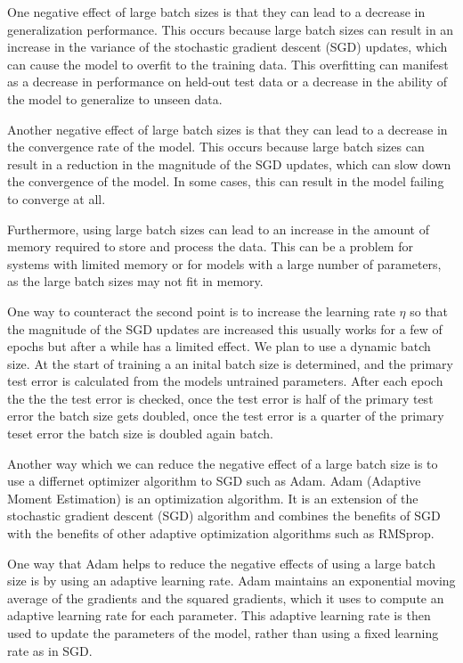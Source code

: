 \documentclass[11pt]{article}
\begin{document}
One negative effect of large batch sizes is that they can lead to a decrease in generalization performance. This occurs because large batch sizes can result in an increase in the variance of the stochastic gradient descent (SGD) updates, which can cause the model to overfit to the training data. This overfitting can manifest as a decrease in performance on held-out test data or a decrease in the ability of the model to generalize to unseen data.

Another negative effect of large batch sizes is that they can lead to a decrease in the convergence rate of the model. This occurs because large batch sizes can result in a reduction in the magnitude of the SGD updates, which can slow down the convergence of the model. In some cases, this can result in the model failing to converge at all.

Furthermore, using large batch sizes can lead to an increase in the amount of memory required to store and process the data. This can be a problem for systems with limited memory or for models with a large number of parameters, as the large batch sizes may not fit in memory.

One way to counteract the second point is to increase the learning rate $\eta$ so that the magnitude of the SGD updates are increased this usually works for a few of epochs but after a while has a limited effect. We plan to use a dynamic batch size. At the start of training a an inital batch size is determined, and the primary test error is calculated from the models untrained parameters. After each epoch the the the test error is checked, once the test error is half of the primary test error the batch size gets doubled, once the test error is a quarter of the primary teset error the batch size is doubled again batch.

Another way which we can reduce the negative effect of a large batch size is to use a differnet optimizer algorithm to SGD such as Adam. Adam (Adaptive Moment Estimation) is an optimization algorithm. It is an extension of the stochastic gradient descent (SGD) algorithm and combines the benefits of SGD with the benefits of other adaptive optimization algorithms such as RMSprop. 

One way that Adam helps to reduce the negative effects of using a large batch size is by using an adaptive learning rate. Adam maintains an exponential moving average of the gradients and the squared gradients, which it uses to compute an adaptive learning rate for each parameter. This adaptive learning rate is then used to update the parameters of the model, rather than using a fixed learning rate as in SGD. 
\end{document}
